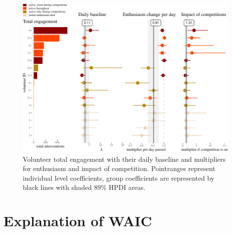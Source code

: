\documentclass[preprint,12pt]{elsarticle}
\begin{document}
\begin{figure}

\begin{center}\includegraphics[width=1\linewidth,angle=90]{figures/fig:volunteersModel17-1} \end{center}
\caption{Volunteer total engagement with their daily baseline and multipliers for enthusiasm and impact of competition. Pointranges represent individual level coefficients, group coefficients are represented by black lines with shaded 89\% HPDI areas.}
\label{fig:volunteersModel}
\end{figure}
















\appendix


\section{Explanation of WAIC}
\end{document}
